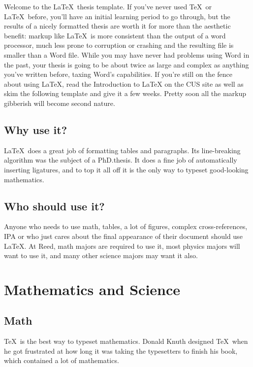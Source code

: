 \documentclass[12pt,twoside]{reedthesis}
\begin{document}
	Welcome to the \LaTeX\ thesis template. If you've never used \TeX\ or \LaTeX\ before, you'll have an initial learning period to go through, but the results of a nicely formatted thesis are worth it for more than the aesthetic benefit: markup like \LaTeX\ is more consistent than the output of a word processor, much less prone to corruption or crashing and the resulting file is smaller than a Word file. While you may have never had problems using Word in the past, your thesis is going to be about twice as large and complex as anything you've written before, taxing Word's capabilities. If you're still on the fence about  using \LaTeX, read the Introduction to LaTeX on the CUS site as well as skim the following template and give it a few weeks. Pretty soon all the markup gibberish will become second nature.

\section{Why use it?}
	
\LaTeX\ does a great job of formatting tables and paragraphs. Its line-breaking algorithm was the subject of a PhD.\thinspace thesis. It does a fine job of automatically inserting ligatures, and to top it all off it is the only way to typeset good-looking mathematics.

\section{Who should use it?}

Anyone who needs to use math, tables, a lot of figures, complex cross-references, IPA or who just cares about the final appearance of their document should use \LaTeX. At Reed, math majors are required to use it, most physics majors will want to use it, and many other science majors may want it also.
	


\chapter{Mathematics and Science}	
\section{Math}
	\TeX\ is the best way to typeset mathematics. Donald Knuth designed \TeX\ when he got frustrated at how long it was taking the typesetters to finish his book, which contained a lot of mathematics. 
	
\end{document}
